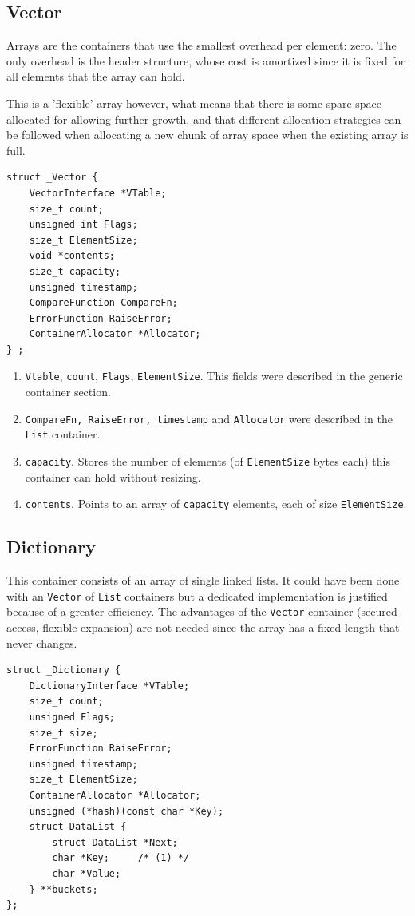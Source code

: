 \documentclass[12pt,a4paper]{memoir} %
\begin{document}
{{\subsection{Vector}
Arrays are the containers that use the smallest overhead per element: zero. The only overhead is the header structure, whose cost is amortized since it is fixed for all elements that the array can hold.

This is a 'flexible' array however, what means that there is some spare space allocated for allowing further growth, and that different allocation strategies can be followed when allocating a new chunk of array space when the existing array is full.
\begin{verbatim}
struct _Vector {
    VectorInterface *VTable;
    size_t count;          
    unsigned int Flags;    
    size_t ElementSize;	
    void *contents;        
    size_t capacity;       
    unsigned timestamp;
    CompareFunction CompareFn;
    ErrorFunction RaiseError;
    ContainerAllocator *Allocator;
} ;
\end{verbatim}
\begin{enumerate}
\item \texttt{Vtable}, \texttt{count}, \texttt{Flags}, \texttt{ElementSize}. This fields were described in the generic container section.
\item \texttt{CompareFn, RaiseError, timestamp} and \texttt{Allocator} were described in the \texttt{List} container.
\item \texttt{capacity}. Stores the number of elements (of \verb,ElementSize, bytes each) this container can hold without resizing.
\item \texttt{contents}. Points to an array of \texttt{capacity} elements, each of size \texttt{ElementSize}.
\end{enumerate}
\subsection{Dictionary}
This container consists of an array of single linked lists. It could have been done with an \texttt{Vector} of \texttt{List} containers but a dedicated implementation is justified because of a greater efficiency. The advantages of the \texttt{Vector} container (secured access, flexible expansion) are not needed since the array has a fixed length that never changes.
\begin{verbatim}
struct _Dictionary {
    DictionaryInterface *VTable;
    size_t count;
    unsigned Flags;
    size_t size;
    ErrorFunction RaiseError;
    unsigned timestamp;
    size_t ElementSize;
    ContainerAllocator *Allocator;
    unsigned (*hash)(const char *Key);
    struct DataList {
        struct DataList *Next;
        char *Key;     /* (1) */
        char *Value;
    } **buckets;
};
\end{verbatim}

}}
\end{document}
